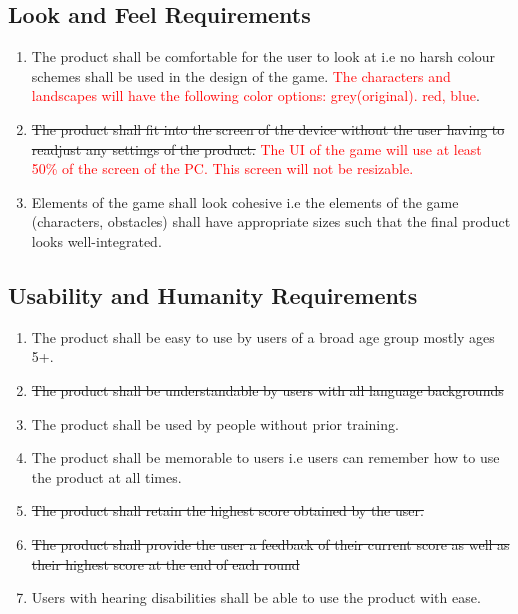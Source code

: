 \documentclass[12pt, titlepage]{article}
\begin{document}
\subsection{Look and Feel Requirements}
\begin{enumerate}
\item The product shall be comfortable for the user to look at i.e no harsh colour schemes shall be used in the design of the game. \textcolor{red}{The characters and landscapes will have the following color options: grey(original). red, blue}.
\item \sout{The product shall fit into the screen of the device without the user having to readjust any settings of the product.} \textcolor{red}{The UI of the game will use at least 50\% of the screen of the PC. This screen will not be resizable.}
\item Elements of the game shall look cohesive i.e the elements of the game (characters, obstacles) shall have appropriate sizes such that the final product looks well-integrated. 
\end{enumerate}


\subsection{Usability and Humanity Requirements}
\begin{enumerate}
\item The product shall be easy to use by users of a broad age group mostly ages 5+.
\item \sout{The product shall be understandable by users with all language backgrounds}
\item The product shall be used by people without prior training.
\item The product shall be memorable to users i.e users can remember how to use the product at all times.
\item \sout{The product shall retain the highest score obtained by the user.} 
\item \sout{The product shall provide the user a feedback of their current score as well as their highest score at the end of each round} 
\item Users with hearing disabilities shall be able to use the product with ease.
\end{enumerate}
\end{document}
